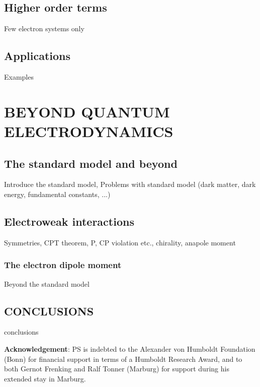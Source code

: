 \documentclass[12pt]{article}
\begin{document}
\subsection{\sffamily Higher order terms}
Few electron systems only

\subsection{\sffamily Applications}
Examples


\section{\sffamily \Large BEYOND QUANTUM ELECTRODYNAMICS}

\subsection{\sffamily The standard model and beyond}
Introduce the standard model, Problems with standard model (dark matter, dark energy, fundamental constants, ...)

\subsection{\sffamily Electroweak interactions}
Symmetries, CPT theorem, P, CP violation etc., chirality, anapole moment

\subsubsection{\sffamily The electron dipole moment}
Beyond the standard model

\subsection{\sffamily \large CONCLUSIONS}
conclusions

{\footnotesize
{\bf Acknowledgement}: PS is indebted to the Alexander von Humboldt Foundation (Bonn) for financial support 
in terms of a Humboldt Research Award, and to both Gernot Frenking and 
Ralf Tonner (Marburg) for support during his extended stay in Marburg.}



\end{document}

